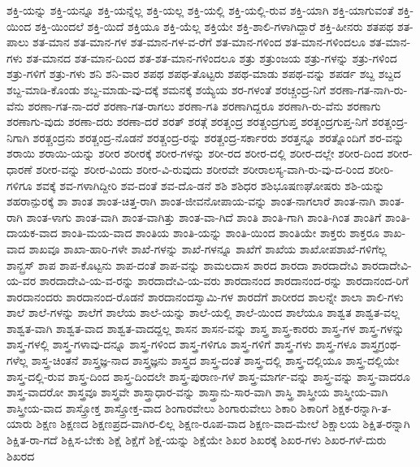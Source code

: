 {ಶಕ್ತಿ-ಯನ್ನು
ಶಕ್ತಿ-ಯನ್ನೂ
ಶಕ್ತಿ-ಯನ್ನೆಲ್ಲ
ಶಕ್ತಿ-ಯಲ್ಲ
ಶಕ್ತಿ-ಯಲ್ಲಿ
ಶಕ್ತಿ-ಯಲ್ಲಿ-ರುವ
ಶಕ್ತಿ-ಯಾಗಿ
ಶಕ್ತಿ-ಯಾಗುವಂತೆ
ಶಕ್ತಿ-ಯಿಂದ
ಶಕ್ತಿ-ಯಿಂದಲೆ
ಶಕ್ತಿ-ಯಿದೆ
ಶಕ್ತಿಯೂ
ಶಕ್ತಿ-ಯೆಲ್ಲ
ಶಕ್ತಿಯೇ
ಶಕ್ತಿ-ಶಾಲಿ-ಗಳಾಗಿದ್ದಾರೆ
ಶಕ್ತಿ-ಹೀನರು
ಶತಪಥ
ಶತ-ಪಾಲು
ಶತ-ಮಾನ
ಶತ-ಮಾನ-ಗಳ
ಶತ-ಮಾನ-ಗಳ-ವ-ರೆಗೆ
ಶತ-ಮಾನ-ಗಳಿಂದ
ಶತ-ಮಾನ-ಗಳಿಂದಲೂ
ಶತ-ಮಾನ-ಗಳು
ಶತ-ಮಾನದ
ಶತ-ಮಾನ-ದಿಂದ
ಶತ-ಶತ-ಮಾನ-ಗಳಿಂದಲೂ
ಶತ್ರು
ಶತ್ರುಂಜಯ
ಶತ್ರು-ಗಳನ್ನು
ಶತ್ರು-ಗಳಿಂದ
ಶತ್ರು-ಗಳಿಗೆ
ಶತ್ರು-ಗಳು
ಶನಿ
ಶನಿ-ವಾರ
ಶಪಥ
ಶಪಥ-ತೊಟ್ಟರು
ಶಪಥ-ಮಾಡು
ಶಪಥ-ವನ್ನು
ಶಪರ್ಡ
ಶಬ್ದ
ಶಬ್ದದ
ಶಬ್ದ-ಮಾಡಿ-ಕೊಂಡು
ಶಬ್ದ-ಮಾಡು-ವು-ದಕ್ಕೆ
ಶಮನಕ್ಕೆ
ಶಯ್ಯೆಯ
ಶರ-ಗಳಂತೆ
ಶರಚ್ಚಂದ್ರ-ನಿಗೆ
ಶರಣಾ-ಗತ-ನಾಗಿ-ರು-ವೆನು
ಶರಣಾ-ಗತ-ನಾ-ದರೆ
ಶರಣಾ-ಗತ-ರಾಗಲು
ಶರಣಾ-ಗತಿ
ಶರಣಾಗಿದ್ದರೂ
ಶರಣಾಗಿ-ರು-ವೆನು
ಶರಣಾಗು
ಶರಣಾಗು-ವುದು
ಶರಣಾ-ದರು
ಶರಣಾ-ದರೆ
ಶರತ್
ಶರತ್ಗೆ
ಶರತ್ಚಂದ್ರ
ಶರತ್ಚಂದ್ರಗುಪ್ತ
ಶರತ್ಚಂದ್ರಗುಪ್ತ-ನಿಗೆ
ಶರತ್ಚಂದ್ರ-ನಿಗಾಗಿ
ಶರತ್ಚಂದ್ರನು
ಶರತ್ಚಂದ್ರ-ನೊಡನೆ
ಶರತ್ಚಂದ್ರ-ರನ್ನು
ಶರತ್ಚಂದ್ರ-ಸರ್ಕಾರರು
ಶರತ್ತನ್ನೂ
ಶರತ್ನೊಂದಿಗೆ
ಶರ-ವನ್ನು
ಶರಾಯಿ
ಶರಾಯಿ-ಯನ್ನು
ಶರೀರ
ಶರೀರಕ್ಕೆ
ಶರೀರ-ಗಳನ್ನು
ಶರೀ-ರದ
ಶರೀರ-ದಲ್ಲಿ
ಶರೀರ-ದಲ್ಲೇ
ಶರೀರ-ದಿಂದ
ಶರೀರ-ಧಾರಣೆ
ಶರೀರ-ವನ್ನು
ಶರೀರ-ವಿಂದು
ಶರೀರ-ವಿ-ರುವುದು
ಶರೀರವೇ
ಶರೀರಾಲಸ್ಯ-ವಾಗಿ-ರು-ವು-ದ-ರಿಂದ
ಶರೀರಿ-ಗಳಿಗೂ
ಶವಕ್ಕೆ
ಶವ-ಗಳಾಗಿದ್ದೀರಿ
ಶವ-ದಂತೆ
ಶವ-ದೊ-ಡನೆ
ಶಶಿ
ಶಶಿಧರ
ಶಶಿಭೂಷಣಘೋಷರು
ಶಶಿ-ಯನ್ನು
ಶಹರಾನ್ಪುರಕ್ಕೆ
ಶಾ
ಶಾಂತ
ಶಾಂತ-ಚಿತ್ತ-ರಾಗಿ
ಶಾಂತ-ಜೀವನೋಪಾಯ-ವನ್ನು
ಶಾಂತ-ನಾಗಲಾರೆ
ಶಾಂತ-ನಾಗಿ
ಶಾಂತ-ರಾಗಿ
ಶಾಂತ-ಳಾಗು
ಶಾಂತ-ವಾಗಿ
ಶಾಂತ-ವಾಗಿತ್ತು
ಶಾಂತ-ವಾ-ಗಿದೆ
ಶಾಂತಿ
ಶಾಂತಿ-ಗಾಗಿ
ಶಾಂತಿ-ಗಿಂತ
ಶಾಂತಿಗೆ
ಶಾಂತಿ-ದಾಯಕ-ವಾದ
ಶಾಂತಿ-ಮಯ-ವಾದ
ಶಾಂತಿಯ
ಶಾಂತಿ-ಯನ್ನು
ಶಾಂತಿ-ಯಿಂದ
ಶಾಂತಿಯೇ
ಶಾಕ್ತರು
ಶಾಕ್ತರೂ
ಶಾಖ-ವಾದ
ಶಾಖವೂ
ಶಾಖಾ-ಹಾರಿ-ಗಳೇ
ಶಾಖೆ-ಗಳನ್ನು
ಶಾಖೆ-ಗಳನ್ನೂ
ಶಾಖೆಗೆ
ಶಾಖೆಯ
ಶಾಖೋಪಶಾಖೆ-ಗಳಿಗೆಲ್ಲ
ಶಾನ್ಬ್ರಸ್
ಶಾಪ
ಶಾಪ-ಕೊಟ್ಟನು
ಶಾಪ-ದಂತೆ
ಶಾಪ-ವನ್ನು
ಶಾಮಲದಾಸ
ಶಾರದ
ಶಾರದಾ
ಶಾರದಾದೇವಿ
ಶಾರದಾದೇವಿ-ಯ-ವರ
ಶಾರದಾದೇವಿ-ಯ-ವ-ರನ್ನು
ಶಾರದಾದೇವಿ-ಯ-ವರು
ಶಾರದಾನಂದ
ಶಾರದಾನಂದ-ರನ್ನು
ಶಾರದಾನಂದ-ರಿಗೆ
ಶಾರದಾನಂದರು
ಶಾರದಾನಂದ-ರೊಡನೆ
ಶಾರದಾನಂದಸ್ವಾಮಿ-ಗಳ
ಶಾರದೆಗೆ
ಶಾರೀರದ
ಶಾಲನ್ನೇ
ಶಾಲಾ
ಶಾಲಿ-ಗಳು
ಶಾಲೆ
ಶಾಲೆ-ಗಳನ್ನು
ಶಾಲೆಗೆ
ಶಾಲೆಯ
ಶಾಲೆ-ಯನ್ನು
ಶಾಲೆ-ಯಲ್ಲಿ
ಶಾಲೆ-ಯಿಂದ
ಶಾಲೆಯೂ
ಶಾಶ್ವತ
ಶಾಶ್ವತ-ವಲ್ಲ
ಶಾಶ್ವತ-ವಾಗಿ
ಶಾಶ್ವತ-ವಾದ
ಶಾಶ್ವತ-ವಾದದ್ದಲ್ಲ
ಶಾಸನ
ಶಾಸನ-ವನ್ನು
ಶಾಸ್ತ್ರ
ಶಾಸ್ತ್ರ-ಕಾರರು
ಶಾಸ್ತ್ರ-ಗಳ
ಶಾಸ್ತ್ರ-ಗಳನ್ನು
ಶಾಸ್ತ್ರ-ಗಳಲ್ಲಿ
ಶಾಸ್ತ್ರ-ಗಳಾವು-ದನ್ನೂ
ಶಾಸ್ತ್ರ-ಗಳಿಂದ
ಶಾಸ್ತ್ರ-ಗಳಿಗೂ
ಶಾಸ್ತ್ರ-ಗಳಿಗೆ
ಶಾಸ್ತ್ರ-ಗಳು
ಶಾಸ್ತ್ರ-ಗಳೂ
ಶಾಸ್ತ್ರಗ್ರಂಥ-ಗಳೆಲ್ಲ
ಶಾಸ್ತ್ರ-ಚಿಂತನೆ
ಶಾಸ್ತ್ರಜ್ಞ-ನಾದ
ಶಾಸ್ತ್ರಜ್ಞನು
ಶಾಸ್ತ್ರದ
ಶಾಸ್ತ್ರ-ದಂತೆ
ಶಾಸ್ತ್ರ-ದಲ್ಲಿ
ಶಾಸ್ತ್ರ-ದಲ್ಲಿಯೂ
ಶಾಸ್ತ್ರ-ದಲ್ಲಿಯೇ
ಶಾಸ್ತ್ರ-ದಲ್ಲಿ-ರುವ
ಶಾಸ್ತ್ರ-ದಿಂದ
ಶಾಸ್ತ್ರ-ದಿಂದಲೇ
ಶಾಸ್ತ್ರ-ಪುರಾಣ-ಗಳೆ
ಶಾಸ್ತ್ರ-ಮಾರ್ಗ-ವನ್ನು
ಶಾಸ್ತ್ರ-ವನ್ನು
ಶಾಸ್ತ್ರ-ವಾದರೂ
ಶಾಸ್ತ್ರ-ವಾದರೋ
ಶಾಸ್ತ್ರವೂ
ಶಾಸ್ತ್ರವೇ
ಶಾಸ್ತ್ರಾಧಾರ-ವನ್ನು
ಶಾಸ್ತ್ರಾನು-ಸಾರ-ವಾಗಿ
ಶಾಸ್ತ್ರಿ
ಶಾಸ್ತ್ರೀಯ
ಶಾಸ್ತ್ರೀಯ-ವಾಗಿ
ಶಾಸ್ತ್ರೀಯ-ವಾದ
ಶಾಸ್ತ್ರೋಕ್ತ
ಶಾಸ್ತ್ರೋಕ್ತ-ವಾದ
ಶಿಂಗಾರವೇಲು
ಶಿಂಗಾರುವೇಲು
ಶಿಕಾರಿ
ಶಿಕಾರಿಗೆ
ಶಿಕ್ಷಕ-ರನ್ನಾಗಿ-ತ-ಯಾರು
ಶಿಕ್ಷಣ
ಶಿಕ್ಷಣದ
ಶಿಕ್ಷಣಪ್ರದ-ವಾಗಿರ-ಲಿಲ್ಲ
ಶಿಕ್ಷಣ-ರೂಪ-ವಾದ
ಶಿಕ್ಷಣ-ವಾದ-ಮೇಲೆ
ಶಿಕ್ಷಾಲಯ
ಶಿಕ್ಷಿತ-ರನ್ನಾಗಿ
ಶಿಕ್ಷಿತ-ರಾ-ಗದೆ
ಶಿಕ್ಷಿಸ-ಬೇಕು
ಶಿಕ್ಷೆ
ಶಿಕ್ಷೆಗೆ
ಶಿಕ್ಷೆ-ಯನ್ನು
ಶಿಕ್ಷೆಯೇ
ಶಿಖರ
ಶಿಖರಕ್ಕೆ
ಶಿಖರ-ಗಳು
ಶಿಖರ-ಗಳೆ-ದುರು
ಶಿಖರದ
}
